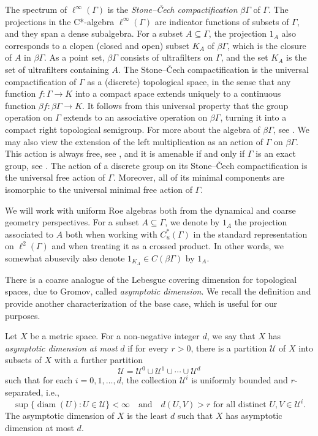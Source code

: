 \documentclass[12pt, a4paper, oneside]{amsart}
\newcommand{\0}{\mathbf{0}}
\newcommand{\1}{\mathbf{1}}
\newcommand{\U}{\mathcal{U}}
\begin{document}
	The spectrum of \(\ell^\infty(\Gamma)\) is the \textit{Stone--\v{C}ech compactification} \(\beta \Gamma\) of \(\Gamma\). The projections in the C*-algebra \(\ell^\infty(\Gamma)\) are indicator functions of subsets of \(\Gamma\), and they span a dense subalgebra. For a subset \(A \subseteq \Gamma\), the projection \(1_A\) also corresponds to a clopen (closed and open) subset \(K_A\) of \(\beta \Gamma\), which is the closure of \(A\) in \(\beta \Gamma\). As a point set, \(\beta \Gamma\) consists of ultrafilters on \(\Gamma\), and the set \(K_A\) is the set of ultrafilters containing \(A\). The Stone--\v{C}ech compactification is the universal compactification of \(\Gamma\) as a (discrete) topological space, in the sense that any function \(f \colon \Gamma \to K\) into a compact space extends uniquely to a continuous function \(\beta f \colon \beta \Gamma \to K\). It follows from this universal property that the group operation on \(\Gamma\) extends to an associative operation on \(\beta \Gamma\), turning it into a compact right topological semigroup. For more about the algebra of \(\beta \Gamma\), see \cite{hindman_strauss_alg}. We may also view the extension of the left multiplication as an action of \(\Gamma\) on \(\beta \Gamma\). This action is always free, see \cite[Theorem 3.34]{hindman_strauss_alg}, and it is amenable if and only if \(\Gamma\) is an exact group, see \cite[Theorem 5.1.7]{brown_ozawa}. The action of a discrete group on its Stone--\v{C}ech compactification is the universal free action of \(\Gamma\). Moreover, all of its minimal components are isomorphic to the universal minimal free action of \(\Gamma\). 
	
	We will work with uniform Roe algebras both from the dynamical and coarse geometry perspectives. For a subset \(A \subseteq \Gamma\), we denote by \(1_A\) the projection associated to \(A\) both when working with \(C_u^*(\Gamma)\) in the standard representation on \(\ell^2(\Gamma)\) and when treating it as a crossed product. In other words, we somewhat abusevily also denote \(1_{K_A} \in C(\beta \Gamma)\) by \(1_A\). 
	
	There is a coarse analogue of the Lebesgue covering dimension for topological spaces, due to Gromov, called \textit{asymptotic dimension}. We recall the definition and provide another characterization of the base case, which is useful for our purposes. 
	
	\begin{definition}
		Let \(X\) be a metric space. For a non-negative integer \(d\), we say that \(X\) has \textit{asymptotic dimension at most} \(d\) if for every \(r > 0\), there is a partition \(\U\) of \(X\) into subsets of \(X\) with a further partition \[\U = \U^0 \cup \U^1 \cup \cdots \cup \U^d\] such that for each \(i = 0, 1, \ldots, d\), the collection \(\U^{i}\) is uniformly bounded and \(r\)-separated, i.e., 
		\[\sup \{ \operatorname{diam}(U) : U \in \U\} < \infty \quad \text{and} \quad d(U, V) > r \text{ for all distinct } U, V \in \U^{i}.\]
		The asymptotic dimension of \(X\) is the least \(d\) such that \(X\) has asymptotic dimension at most \(d\). 
	\end{definition}
	
\end{document}
